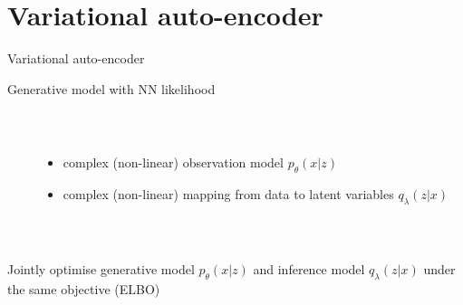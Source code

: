 
\section{Variational auto-encoder}


\begin{frame}{Variational auto-encoder}

Generative model with NN likelihood

~

\begin{columns}
	\begin{column}{0.2\textwidth}
    \end{column}
    \begin{column}{0.7\textwidth}
    	\begin{itemize}
			\item complex (non-linear) observation model $p_\theta(x|z)$
			\item complex (non-linear) mapping from data to latent variables $q_\lambda(z|x)$
    	\end{itemize}
    \end{column}
    \end{columns}
    ~
    
    Jointly optimise generative model $p_\theta(x|z)$ and inference model $q_\lambda(z|x)$ under the same objective (ELBO)
    
\end{frame}


